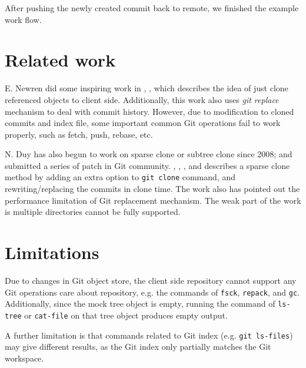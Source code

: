 \documentclass[copyrightwanted=false]{sigplanconf}
\begin{document}
After pushing the newly created commit back to remote, we finished the
example work flow.

\section{Related work}
E. Newren did some inspiring work in \cite{newren10-0}, \cite{newren10-1},
which describes the idea of just clone referenced objects to client side.
Additionally, this work also uses \emph{git replace} mechanism to deal with
commit history\cite{git-replace}.
However, due to modification to cloned commits and index file, some important common
Git operations fail to work properly, such as fetch, push, rebase, etc.

N. Duy has also begun to work on sparse clone or subtree clone since 2008; and
submitted a series of patch in Git community.
\cite{duy08}, \cite{duy10-1}, \cite{duy10-2}, and \cite{duy10-3} describes a
sparse clone method by adding an extra option to \verb|git clone| command, and
rewriting/replacing the commits in clone time.
The work also has pointed out the performance limitation of Git replacement
mechanism.
The weak part of the work is multiple directories cannot be fully supported.

\section{Limitations}
Due to changes in Git object store, the client side repository cannot
support any Git operations care about repository, e.g. the commands of
\verb|fsck|, \verb|repack|, and \verb|gc|.
Additionally, since the mock tree object is empty, running the command of
\verb|ls-tree| or \verb|cat-file| on that tree object produces empty output.

A further limitation is that commands related to Git index (e.g. \verb|git ls-files|) may give
different results,
as the Git index only partially matches the Git workspace.
\end{document}
